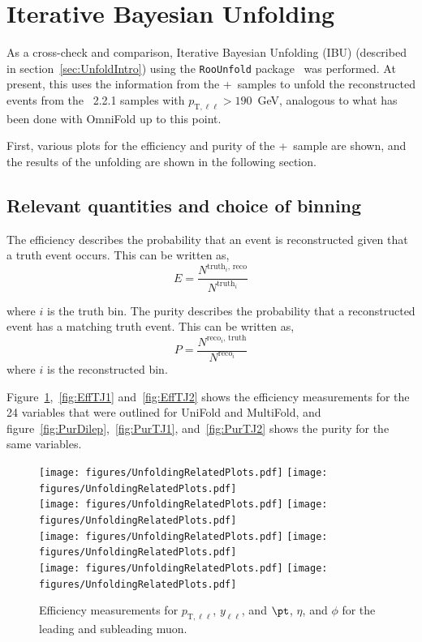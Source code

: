 \section{Iterative Bayesian Unfolding}
\label{app:IBU}

As a cross-check and comparison, Iterative Bayesian Unfolding (IBU) (described in section~\ref{sec:UnfoldIntro}) using the \texttt{RooUnfold} package~\cite{Adye:2011gm} was performed. At present, this uses the information from the \powheg+\pythia~samples to unfold the reconstructed events from the \sherpa~2.2.1 samples with $p_{\text{T},\ell\ell} > 190$~GeV, analogous to what has been done with OmniFold up to this point.

First, various plots for the efficiency and purity of the \powheg+\pythia~sample are shown, and the results of the unfolding are shown in the following section.

\subsection{Relevant quantities and choice of binning}
The efficiency describes the probability that an event is reconstructed given that a truth event occurs. This can be written as,
\begin{equation}
  E=\frac{N^{\text{truth$_i$, reco}}}{N^{\text{truth$_i$}}}
\end{equation}

where $i$ is the truth bin. The purity describes the probability that a reconstructed event has a matching truth event. This can be written as,
\begin{equation}
  P=\frac{N^{\text{reco$_i$, truth}}}{N^{\text{reco$_i$}}}
\end{equation}
where $i$ is the reconstructed bin.

Figure~\ref{fig:EffDilep},~\ref{fig:EffTJ1} and~\ref{fig:EffTJ2} shows the efficiency measurements for the 24 variables that were outlined for UniFold and MultiFold, and figure~\ref{fig:PurDilep},~\ref{fig:PurTJ1}, and~\ref{fig:PurTJ2} shows the purity for the same variables.

\begin{figure}[h!]
  \centering
  \texttt{[image: figures/UnfoldingRelatedPlots.pdf]}
  \texttt{[image: figures/UnfoldingRelatedPlots.pdf]} \\
  \texttt{[image: figures/UnfoldingRelatedPlots.pdf]}
  \texttt{[image: figures/UnfoldingRelatedPlots.pdf]} \\
  \texttt{[image: figures/UnfoldingRelatedPlots.pdf]}
  \texttt{[image: figures/UnfoldingRelatedPlots.pdf]} \\
  \texttt{[image: figures/UnfoldingRelatedPlots.pdf]}
  \texttt{[image: figures/UnfoldingRelatedPlots.pdf]} \\
  \caption{Efficiency measurements for $p_{\text{T},\ell\ell}$, $y_{\ell\ell}$, and $\pt$, $\eta$, and $\phi$ for the leading and subleading muon.}
  \label{fig:EffDilep}
\end{figure}

